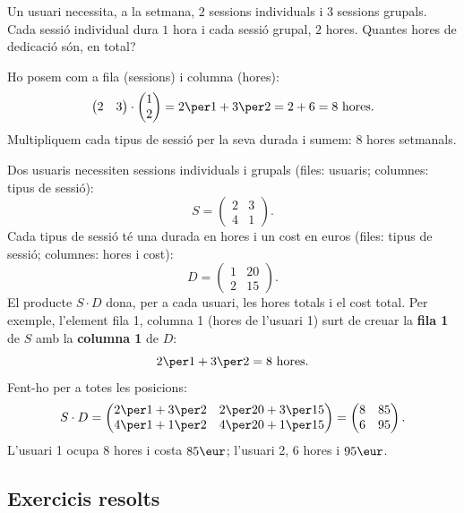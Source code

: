 \begin{exemple}
Un usuari necessita, a la setmana, $2$ sessions individuals i $3$ sessions
grupals. Cada sessió individual dura $1$ hora i cada sessió grupal, $2$ hores.
Quantes hores de dedicació són, en total?

Ho posem com a fila (sessions) i columna (hores):
\[
\begin{pmatrix} 2 & 3 \end{pmatrix}\cdot\begin{pmatrix} 1 \\ 2 \end{pmatrix}
= 2\per 1 + 3\per 2 = 2 + 6 = 8 \text{ hores}.
\]
Multipliquem cada tipus de sessió per la seva durada i sumem: $8$ hores setmanals.
\end{exemple}

\begin{exemple}
Dos usuaris necessiten sessions individuals i grupals (files: usuaris; columnes:
tipus de sessió):
\[
S=\begin{pmatrix} 2 & 3 \\ 4 & 1 \end{pmatrix}.
\]
Cada tipus de sessió té una durada en hores i un cost en euros (files: tipus de
sessió; columnes: hores i cost):
\[
D=\begin{pmatrix} 1 & 20 \\ 2 & 15 \end{pmatrix}.
\]
El producte $S\cdot D$ dona, per a cada usuari, les hores totals i el cost total.
Per exemple, l'element fila 1, columna 1 (hores de l'usuari 1) surt de creuar la
\textbf{fila 1} de $S$ amb la \textbf{columna 1} de $D$:
\[
2\per 1 + 3\per 2 = 8 \text{ hores}.
\]
Fent-ho per a totes les posicions:
\[
S\cdot D=\begin{pmatrix} 2\per 1+3\per 2 & 2\per 20+3\per 15 \\ 4\per 1+1\per 2 & 4\per 20+1\per 15 \end{pmatrix}
        =\begin{pmatrix} 8 & 85 \\ 6 & 95 \end{pmatrix}.
\]
L'usuari 1 ocupa $8$ hores i costa $85\eur$; l'usuari 2, $6$ hores i $95\eur$.
\end{exemple}

\subsection{Exercicis resolts}

